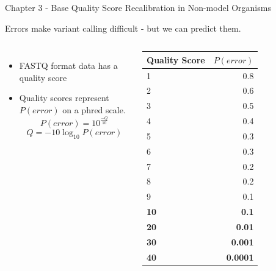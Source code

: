 \documentclass{beamer}
\begin{document}
\begin{frame}{Chapter 3 - Base Quality Score Recalibration in Non-model Organisms}

Errors make variant calling difficult - but we can predict them.

\begin{columns}
	\begin{itemize}
		\item FASTQ format data has a quality score
		\item Quality scores represent $P(error)$ on a phred scale.
		\begin{displaymath}
		P(error) = 10^{\frac{-Q}{10}}
		\end{displaymath}
		\begin{displaymath}
		Q = -10\log_{10}{P(error)}
		\end{displaymath}
	\end{itemize}
	\begin{tabular}{l r} \toprule
	\bfseries Quality Score & \bfseries $P(error)$ \\
	\hline
	1 & 0.8 \\
	2 & 0.6 \\
	3 & 0.5 \\
	4 & 0.4 \\
	5 & 0.3 \\
	6 & 0.3 \\
	7 & 0.2 \\
	8 & 0.2 \\
	9 & 0.1 \\
	\bfseries 10 & \bfseries  0.1 \\
	\bfseries 20 & \bfseries 0.01 \\
	\bfseries 30 & \bfseries 0.001 \\
	\bfseries 40 & \bfseries 0.0001 \\
	\end{tabular}
\end{columns}

\end{frame}
\end{document}
